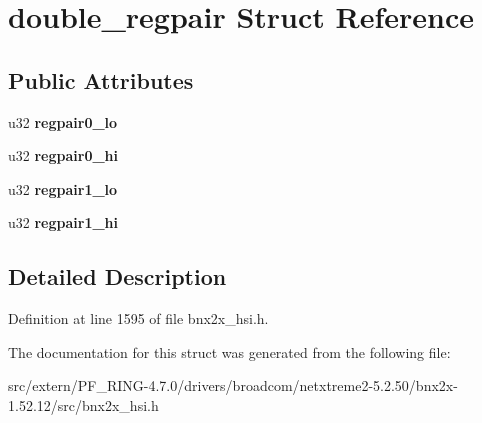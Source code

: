 \hypertarget{structdouble__regpair}{
\section{double\_\-regpair Struct Reference}
\label{structdouble__regpair}
}
\subsection*{Public Attributes}
\begin{DoxyCompactItemize}
\item 
\hypertarget{structdouble__regpair_ac3fd2f91860c67a60223e6be850d81b0}{
u32 {\bfseries regpair0\_\-lo}}
\label{structdouble__regpair_ac3fd2f91860c67a60223e6be850d81b0}

\item 
\hypertarget{structdouble__regpair_a461a5113aa0f1801a3af7365626df834}{
u32 {\bfseries regpair0\_\-hi}}
\label{structdouble__regpair_a461a5113aa0f1801a3af7365626df834}

\item 
\hypertarget{structdouble__regpair_a1db16c0b9fcdf02e1ecb8ef69e76b886}{
u32 {\bfseries regpair1\_\-lo}}
\label{structdouble__regpair_a1db16c0b9fcdf02e1ecb8ef69e76b886}

\item 
\hypertarget{structdouble__regpair_a0d8292af8b96a9076c72bffc828bf6d2}{
u32 {\bfseries regpair1\_\-hi}}
\label{structdouble__regpair_a0d8292af8b96a9076c72bffc828bf6d2}

\end{DoxyCompactItemize}


\subsection{Detailed Description}


Definition at line 1595 of file bnx2x\_\-hsi.h.



The documentation for this struct was generated from the following file:\begin{DoxyCompactItemize}
\item 
src/extern/PF\_\-RING-\/4.7.0/drivers/broadcom/netxtreme2-\/5.2.50/bnx2x-\/1.52.12/src/bnx2x\_\-hsi.h\end{DoxyCompactItemize}
